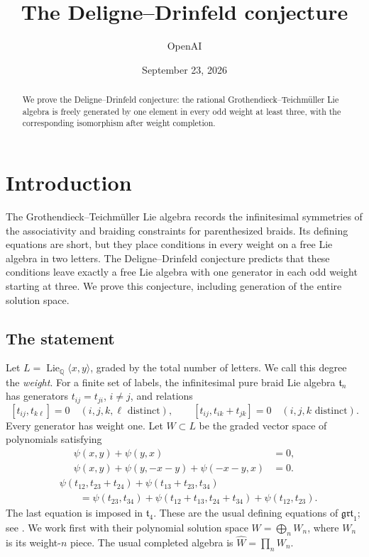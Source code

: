 \documentclass[11pt]{article}
\title{The Deligne--Drinfeld conjecture}
\author{OpenAI}
\date{September 23, 2026}
\theoremstyle{definition}
\theoremstyle{remark}
\numberwithin{equation}{section}
\begin{document}
\begin{abstract}
We prove the Deligne--Drinfeld conjecture: the rational Grothendieck--Teichm\"uller Lie algebra is freely generated by one element in every odd weight at least three, with the corresponding isomorphism after weight completion.
\end{abstract}
\tableofcontents
\section{Introduction}\label{sec:introduction}

The Grothendieck--Teichm\"uller Lie algebra records the infinitesimal
symmetries of the associativity and braiding constraints for
parenthesized braids.  Its defining equations are short, but they place
conditions in every weight on a free Lie algebra in two letters.
The Deligne--Drinfeld conjecture predicts that these conditions leave
exactly a free Lie algebra with one generator in each odd weight
starting at three.  We prove this conjecture, including generation of
the entire solution space.

\subsection{The statement}
Let \(L=\operatorname{Lie}_{\mathbb Q}\langle x,y\rangle\), graded by the total number of
letters.  We call this degree the \emph{weight}.  For a finite set of
labels, the infinitesimal pure braid Lie algebra \(\mathfrak t_n\)
has generators \(t_{ij}=t_{ji}\), \(i\ne j\), and relations
\begin{equation}\label{eq:braid-relations}
 [t_{ij},t_{k\ell}]=0\quad(i,j,k,\ell\text{ distinct}),\qquad
 [t_{ij},t_{ik}+t_{jk}]=0\quad(i,j,k\text{ distinct}).
\end{equation}
Every generator has weight one.
Let \(W\subset L\) be the graded vector space of polynomials satisfying
\begin{align}
 \psi(x,y)+\psi(y,x)&=0,\label{eq:antisymmetry}\\
 \psi(x,y)+\psi(y,-x-y)+\psi(-x-y,x)&=0.\label{eq:three-term}
\end{align}
\begin{equation}\label{eq:pentagon}
\begin{aligned}
 &\psi(t_{12},t_{23}+t_{24})+\psi(t_{13}+t_{23},t_{34})\\
 &\qquad=
 \psi(t_{23},t_{34})+\psi(t_{12}+t_{13},t_{24}+t_{34})
 +\psi(t_{12},t_{23}).
\end{aligned}
\end{equation}
The last equation is imposed in \(\mathfrak t_4\).
These are the usual defining equations of \(\mathfrak{grt}_1\);
see \cite[Section~6.1]{Willwacher}.  We work first with their polynomial
solution space \(W=\bigoplus_n W_n\), where \(W_n\) is its weight-\(n\)
piece.  The usual completed algebra is \(\widehat W=\prod_n W_n\).
\end{document}
